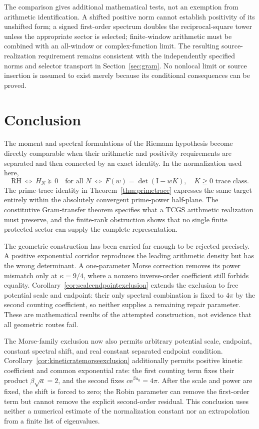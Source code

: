\documentclass[11pt,letterpaper]{article}
\numberwithin{equation}{section}
\theoremstyle{definition}
\theoremstyle{remark}
\newcommand{\Id}{\mathrm I}
\newcommand{\e}{\mathrm e}
\begin{document}
The comparison gives additional mathematical tests, not an exemption from arithmetic identification. A shifted positive norm cannot establish positivity of its unshifted form; a signed first-order spectrum doubles the reciprocal-square tower unless the appropriate sector is selected; finite-window arithmetic must be combined with an all-window or complex-function limit. The resulting source-realization requirement remains consistent with the independently specified norms and selector transport in Section~\ref{sec:gram}. No nonlocal limit or source insertion is assumed to exist merely because its conditional consequences can be proved.

\section{Conclusion}
\label{sec:conclusion}
The moment and spectral formulations of the Riemann hypothesis become directly comparable when their arithmetic and positivity requirements are separated and then connected by an exact identity. In the normalization used here,
\begin{equation}
 \mathrm{RH}
 \ \Longleftrightarrow\ H_N\succeq0\quad\text{for all }N
 \ \Longleftrightarrow\ F(w)=\det(\Id-wK),\quad K\geq0\text{ trace class}.
 \label{eq:conclusionsummary}
\end{equation}
The prime-trace identity in Theorem~\ref{thm:primetrace} expresses the same target entirely within the absolutely convergent prime-power half-plane. The constitutive Gram-transfer theorem specifies what a TCGS arithmetic realization must preserve, and the finite-rank obstruction shows that no single finite protected sector can supply the complete representation.

The geometric construction has been carried far enough to be rejected precisely. A positive exponential corridor reproduces the leading arithmetic density but has the wrong determinant. A one-parameter Morse correction removes its power mismatch only at $\kappa=9/4$, where a nonzero inverse-order coefficient still forbids equality. Corollary~\ref{cor:scaleendpointexclusion} extends the exclusion to free potential scale and endpoint: their only spectral combination is fixed to $4\pi$ by the second counting coefficient, so neither supplies a remaining repair parameter. These are mathematical results of the attempted construction, not evidence that all geometric routes fail.

The Morse-family exclusion now also permits arbitrary potential scale, endpoint, constant spectral shift, and real constant separated endpoint condition. Corollary~\ref{cor:kineticratemorseexclusion} additionally permits positive kinetic coefficient and common exponential rate: the first counting term fixes their product $\beta\sqrt a=2$, and the second fixes $c\e^{\beta u_0}=4\pi$. After the scale and power are fixed, the shift is forced to zero; the Robin parameter can remove the first-order term but cannot remove the explicit second-order residual. This conclusion uses neither a numerical estimate of the normalization constant nor an extrapolation from a finite list of eigenvalues.
\end{document}
